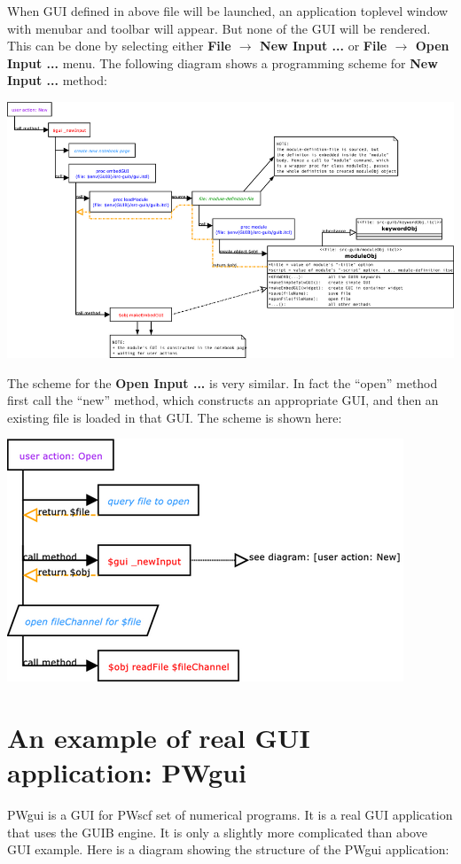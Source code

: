 \documentclass[12pt]{article}
\def\key#1{{\bf #1}}
\begin{document}
When GUI defined in above file will be launched, an application
toplevel window with menubar and toolbar will appear. But none of the
GUI will be rendered. This can be done by selecting either \key{File
  $\rightarrow$ New Input ...} or \key{File $\rightarrow$ Open Input
  ...} menu. The following diagram shows a programming scheme for
\key{New Input ...} method:

\includegraphics[width=1.0\textwidth]{diagrams/GUI-new.png}

The scheme for the \key{Open Input ...} is very similar. In fact the
``open'' method first call the ``new'' method, which constructs an
appropriate GUI, and then an existing file is loaded in that GUI. The
scheme is shown here:

\includegraphics[width=.5\textwidth]{diagrams/GUI-open.png}

\section{An example of real GUI application: PWgui}

PWgui is a GUI for PWscf set of numerical programs. It is a real GUI
application that uses the GUIB engine. It is only a slightly more
complicated than above GUI example. Here is a diagram showing the
structure of the PWgui application:
\end{document}
